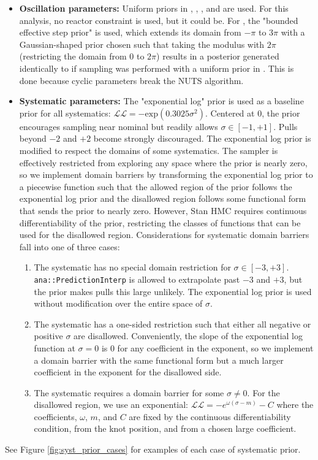 \documentclass{article}
\begin{document}
\begin{itemize}
  \item \textbf{Oscillation parameters:} Uniform priors in , , , and \dcp are used. For this analysis, no reactor constraint is used, but it could be. For \dcp, the "bounded effective step prior" is used, which extends its domain from $-\pi$ to $3\pi$ with a Gaussian-shaped prior chosen such that taking the modulus with $2\pi$ (restricting the domain from $0$ to $2\pi$) results in a posterior generated identically to if sampling was performed with a uniform prior in \dcp. This is done because cyclic parameters break the NUTS algorithm.
  \item \textbf{Systematic parameters:} The "exponential log" prior is used as a baseline prior for all systematics: $\mathcal{LL} = -\mathrm{exp}(0.3025\sigma^2)$. Centered at 0, the prior encourages sampling near nominal but readily allows $\sigma \in [-1,+1]$. Pulls beyond $-2$ and $+2$ become strongly discouraged. The exponential log prior is modified to respect the domains of some systematics. The sampler is effectively restricted from exploring any space where the prior is nearly zero, so we implement domain barriers by transforming the exponential log prior to a piecewise function such that the allowed region of the prior follows the exponential log prior and the disallowed region follows some functional form that sends the prior to nearly zero. However, Stan HMC requires continuous differentiability of the prior, restricting the classes of functions that can be used for the disallowed region. Considerations for systematic domain barriers fall into one of three cases:
  \begin{enumerate}
    \item The systematic has no special domain restriction for $\sigma \in [-3,+3]$. \texttt{ana::\-Prediction\-Interp} is allowed to extrapolate past $-3$ and $+3$, but the prior makes pulls this large unlikely. The exponential log prior is used without modification over the entire space of $\sigma$.
    \item The systematic has a one-sided restriction such that either all negative or positive $\sigma$ are disallowed. Conveniently, the slope of the exponential log function at $\sigma = 0$ is 0 for any coefficient in the exponent, so we implement a domain barrier with the same functional form but a much larger coefficient in the exponent for the disallowed side.
    \item The systematic requires a domain barrier for some $\sigma \ne 0$. For the disallowed region, we use an exponential: $\mathcal{LL} = -e^{\omega(\sigma-m)} - C$ where the coefficients, $\omega$, $m$, and $C$ are fixed by the continuous differentiability condition, from the knot position, and from a chosen large coefficient.
  \end{enumerate}
\end{itemize}
See Figure \ref{fig:syst_prior_cases} for examples of each case of systematic prior.
\end{document}
